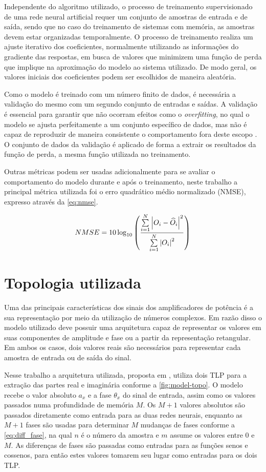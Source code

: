 Independente do algoritmo utilizado, o processo de treinamento supervisionado de uma rede neural artificial requer um conjunto de amostras de entrada e de saída, sendo que no caso do treinamento de sistemas com memória, as amostras devem estar organizadas temporalmente. O processo de treinamento realiza um ajuste iterativo dos coeficientes, normalmente utilizando as informações do gradiente das respostas, em busca de valores que minimizem uma função de perda que implique na aproximação do modelo ao sistema utilizado. De modo geral, os valores iniciais dos coeficientes podem ser escolhidos de maneira aleatória.

Como o modelo é treinado com um número finito de dados, é necessária a validação do mesmo com um segundo conjunto de entradas e saídas. A validação é essencial para garantir que não ocorram efeitos como o \textit{overfitting}, no qual o modelo se ajusta perfeitamente a um conjunto específico de dados, mas não é capaz de reproduzir de maneira consistente o comportamento fora deste escopo \cite{haykin1999neural}. O conjunto de dados da validação é aplicado de forma a extrair os resultados da função de perda, a mesma função utilizada no treinamento.

Outras métricas podem ser usadas adicionalmente para se avaliar o comportamento do modelo durante e após o treinamento, neste trabalho a principal métrica utilizada foi o erro quadrático médio normalizado (NMSE), expresso através da \autoref{eq:nmse}.

\begin{align}
NMSE = 10\log_{10}
\left(
\frac
{\sum\limits_{i=1}^{N}
\abs{O_{i}-\widehat{O}_{i}}^{2}}
{\sum\limits_{i=1}^{N}
\abs{O_{i}}^2}
\right)
\label{eq:nmse}
\end{align}

\section{Topologia utilizada} \label{sec:model-topo}
Uma das principais características dos sinais dos amplificadores de potência é a sua representação por meio da utilização de números complexos. Em razão disso o modelo utilizado deve possuir uma arquitetura capaz de representar os valores em suas componentes de amplitude e fase ou a partir da representação retangular. Em ambos os casos, dois valores reais são necessários para representar cada amostra de entrada ou de saída do sinal.

Nesse trabalho a arquitetura utilizada, proposta em \cite{chipansky_freire_modfied_2015}, utiliza dois TLP para a extração das partes real e imaginária conforme a \autoref{fig:model-topo}. O modelo recebe o valor absoluto $a_x$ e a fase $\theta_x$ do sinal de entrada, assim como os valores passados numa profundidade de memória $M$. Os $M+1$ valores absolutos são passados diretamente como entrada para as duas redes neurais, enquanto as $M+1$ fases são usadas para determinar $M$ mudanças de fases conforme a \autoref{eq:diff_fase}, na qual $n$ é o número da amostra e $m$ assume os valores entre $0$ e $M$. As diferenças de fases são passadas como entradas para as funções senos e cossenos, para então estes valores tomarem seu lugar como entradas para os dois TLP.

